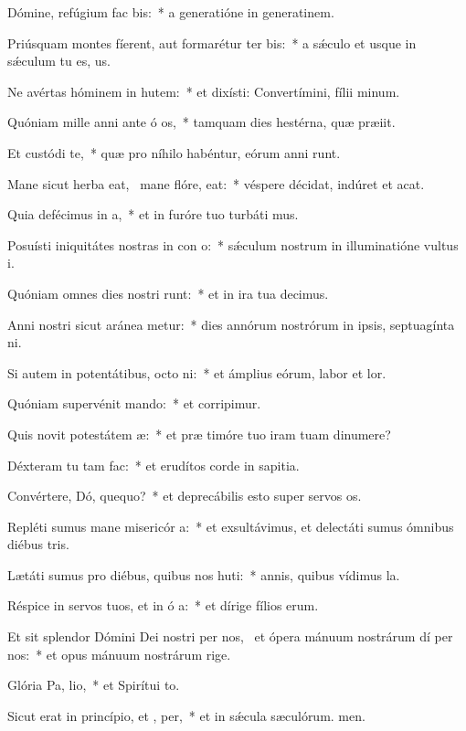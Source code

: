 \item Dómine, refúgium fac  bis:~* a generatióne in generatinem.
\item Priúsquam montes fíerent, aut formarétur ter  bis:~* a sǽculo et usque in sǽculum tu es, us.
\item Ne avértas hóminem in hutem:~* et dixísti: Convertímini, fílii minum.
\item Quóniam mille anni ante ó os,~* tamquam dies hestérna, quæ præiit.
\item Et custódi  te,~* quæ pro níhilo habéntur, eórum anni runt.
\item Mane sicut herba eat,~\pscross{} mane flóre,  eat:~* véspere décidat, indúret et acat.
\item Quia defécimus in  a,~* et in furóre tuo turbáti mus.
\item Posuísti iniquitátes nostras in con o:~* sǽculum nostrum in illuminatióne vultus i.
\item Quóniam omnes dies nostri runt:~* et in ira tua decimus.
\item Anni nostri sicut aránea metur:~* dies annórum nostrórum in ipsis, septuagínta ni.
\item Si autem in potentátibus, octo ni:~* et ámplius eórum, labor et lor.
\item Quóniam supervénit mando:~* et corripimur.
\item Quis novit potestátem  æ:~* et præ timóre tuo iram tuam dinumere?
\item Déxteram tu  tam fac:~* et erudítos corde in sapitia.
\item Convértere, Dó, quequo?~* et deprecábilis esto super servos os.
\item Repléti sumus mane misericór a:~* et exsultávimus, et delectáti sumus ómnibus diébus tris.
\item Lætáti sumus pro diébus, quibus nos huti:~* annis, quibus vídimus la.
\item Réspice in servos tuos, et in ó a:~* et dírige fílios erum.
\item Et sit splendor Dómini Dei nostri per nos,~\pscross{} et ópera mánuum nostrárum dí per nos:~* et opus mánuum nostrárum rige.
\item Glória Pa,  lio,~* et Spirítui to.
\item Sicut erat in princípio, et ,  per,~* et in sǽcula sæculórum. men.
